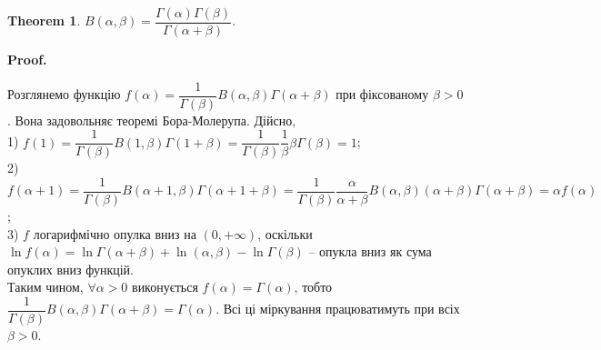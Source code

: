 \documentclass[a4paper, 10pt]{article}
\makeatletter
\def\huge{\displaystyle}
\theoremstyle{theoremdd}
\newtheorem{theorem}{Theorem}[subsection]
\theoremstyle{theoremdd}
\theoremstyle{theoremdd}
\theoremstyle{theoremdd}
\theoremstyle{theoremdd}
\theoremstyle{theoremdd}
\theoremstyle{theoremdd}
\theoremstyle{theoremdd}
\theoremstyle{theoremdd}
\renewenvironment{proof}[1][Proof.\\]{\par
\pushQED{\hfill \qed}%
\normalfont \topsep6\p@\@plus6\p@\relax
\trivlist
\item\relax
{\bfseries
#1\@addpunct{.}}\hspace\labelsep\ignorespaces
}{%
\popQED\endtrivlist\@endpefalse
}
\makeatother
\begin{document}

\begin{theorem}
$B(\alpha,\beta) = \dfrac{\Gamma(\alpha) \Gamma(\beta)}{\Gamma(\alpha+\beta)}$.
\end{theorem}

\begin{proof}
Розглянемо функцію $f(\alpha) = \dfrac{1}{\Gamma(\beta)} B(\alpha,\beta) \Gamma(\alpha+\beta)$ при фіксованому $\beta > 0$. Вона задовольняє теоремі Бора-Молерупа. Дійсно,\\
1) $f(1) = \dfrac{1}{\Gamma(\beta)} B(1,\beta) \Gamma(1+\beta) = \dfrac{1}{\Gamma(\beta)} \dfrac{1}{\beta} \beta \Gamma(\beta) = 1$;\\
2) $f(\alpha+1) = \dfrac{1}{\Gamma(\beta)} B(\alpha+1,\beta) \Gamma(\alpha+1+\beta) = \dfrac{1}{\Gamma(\beta)} \dfrac{\alpha}{\alpha+\beta} B(\alpha,\beta) (\alpha+\beta) \Gamma(\alpha+\beta) = \alpha f(\alpha)$;\\
3) $f$ логарифмічно опулка вниз на $(0,+\infty)$, оскільки $\ln f(\alpha) = \ln \Gamma(\alpha+\beta) + \ln(\alpha,\beta) - \ln \Gamma(\beta)$ -- опукла вниз як сума опуклих вниз функцій.\\
Таким чином, $\forall \alpha >0$ виконується $f(\alpha) = \Gamma(\alpha)$, тобто $\dfrac{1}{\Gamma(\beta)} B(\alpha,\beta) \Gamma(\alpha+\beta) = \Gamma(\alpha)$. Всі ці міркування працюватимуть при всіх $\beta > 0$.
\end{proof}
\end{document}
